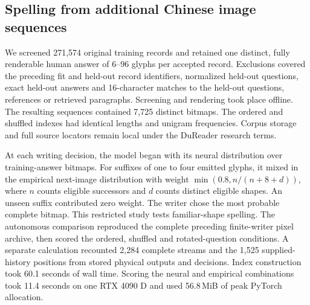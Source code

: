 \subsection*{Spelling from additional Chinese image sequences}
We screened 271,574 original training records and retained one distinct, fully renderable human answer of 6--96 glyphs per accepted record. Exclusions covered the preceding fit and held-out record identifiers, normalized held-out questions, exact held-out answers and 16-character matches to the held-out questions, references or retrieved paragraphs. Screening and rendering took place offline. The resulting sequences contained 7,725 distinct bitmaps. The ordered and shuffled indexes had identical lengths and unigram frequencies. Corpus storage and full source locators remain local under the DuReader research terms.

At each writing decision, the model began with its neural distribution over training-answer bitmaps. For suffixes of one to four emitted glyphs, it mixed in the empirical next-image distribution with weight $\min(0.8,n/(n+8+d))$, where $n$ counts eligible successors and $d$ counts distinct eligible shapes. An unseen suffix contributed zero weight. The writer chose the most probable complete bitmap. This restricted study tests familiar-shape spelling. The autonomous comparison reproduced the complete preceding finite-writer pixel archive, then scored the ordered, shuffled and rotated-question conditions. A separate calculation recounted 2,284 complete streams and the 1,525 supplied-history positions from stored physical outputs and decisions. Index construction took 60.1 seconds of wall time. Scoring the neural and empirical combinations took 11.4 seconds on one RTX 4090 D and used 56.8\,MiB of peak PyTorch allocation.

